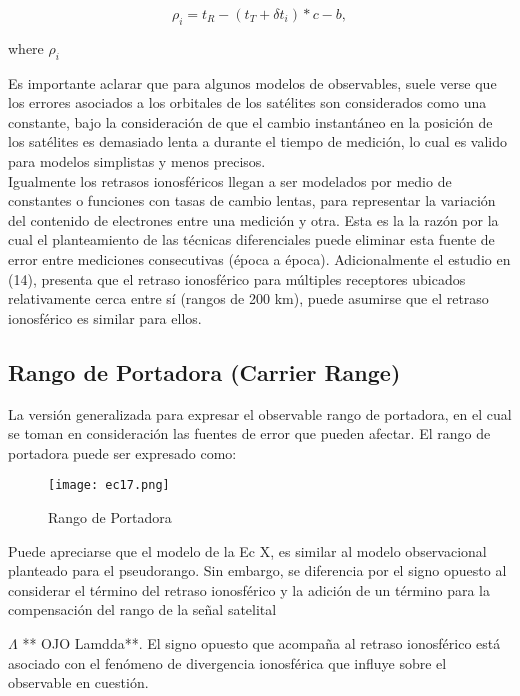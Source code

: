 
\begin{equation}
\rho_i = t_R - (t_T + \delta t_i) * c - b,
\label{eq:pseudorange}
\end{equation}

\noindent where $\rho_i$


Es importante aclarar que para algunos modelos de observables, suele verse que los errores asociados a los orbitales de los satélites son considerados como una constante, bajo la consideración de que el cambio instantáneo en la posición de los satélites es demasiado lenta a durante el tiempo de medición, lo cual es valido para modelos simplistas y menos precisos.\\

Igualmente los retrasos ionosféricos llegan a ser modelados por medio de constantes o funciones con tasas de cambio lentas, para representar la variación del contenido de electrones entre una medición y otra. Esta es la la razón por la cual el planteamiento de las técnicas diferenciales puede eliminar esta fuente de error entre mediciones consecutivas (época a época). Adicionalmente el estudio en (14), presenta que el retraso ionosférico para múltiples receptores ubicados relativamente cerca entre sí (rangos de 200 km), puede asumirse que el retraso ionosférico es similar para ellos.\\


\subsection{Rango de Portadora (Carrier Range)}

La versión generalizada para expresar el observable rango de portadora, en el cual se toman en consideración las fuentes de error que pueden afectar. El rango de portadora puede ser expresado como:

	\begin{figure}[ht]
		    \centering
		    \texttt{[image: ec17.png]}
		    \caption{Rango de Portadora}
		    \label{fig:EcRangoPortadora}
	\end{figure}


Puede apreciarse que el modelo de la Ec X, es similar al modelo observacional planteado para el pseudorango. Sin embargo, se diferencia por el signo opuesto al considerar el término del retraso ionosférico y la adición de un término para la compensación del rango de la señal satelital \begin{shaded}$\Lambda$ ** OJO Lamdda**. El signo opuesto que acompaña al retraso ionosférico está asociado con el fenómeno de divergencia ionosférica que influye sobre el observable en cuestión.
\end{shaded}

